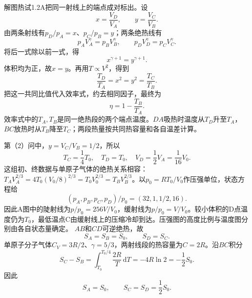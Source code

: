 \documentclass[UTF8,fontset=fandol,a4paper,11pt]{ctexart}
\begin{document}
解图热试1.2A把同一射线上的端点成对标出。设
\[
x=\frac{V_D}{V_A},\qquad y=\frac{V_C}{V_B}.
\]
由两条射线有$p_D/p_A=x$、$p_C/p_B=y$；两条绝热线有
\[
p_AV_A^\gamma=p_BV_B^\gamma,\qquad
p_DV_D^\gamma=p_CV_C^\gamma.
\]
将后一式除以前一式，得
\[
x^{\gamma+1}=y^{\gamma+1}.
\]
体积均为正，故$x=y$。再用$T\propto V^2$，得到
\[
\frac{T_D}{T_A}=x^2=y^2=\frac{T_C}{T_B}.
\]
把这一共同比值代入效率式，约去相同因子，最终为
\[
\boxed{\eta=1-\frac{T_B}{T_A}}.
\]
效率式中的$T_A,T_B$是同一绝热段的两个端点温度。$DA$吸热时温度从$T_D$升至$T_A$，$BC$放热时从$T_B$降至$T_C$；两段热量按共同热容量和各自温差计算。

第（2）问中，$y=V_C/V_B=1/2$，所以
\[
\boxed{T_C=\frac14T_0,\quad T_D=T_0,\quad
V_D=\frac12V_A=\frac1{16}V_0}.
\]
这组初、终数据与单原子气体的绝热关系相容：$T_AV_A^{2/3}=4T_0(V_0/8)^{2/3}=T_0V_0^{2/3}=T_BV_B^{2/3}$。以$p_0=RT_0/V_0$作压强单位，状态方程给
\[
 (p_A,p_B,p_C,p_D)/p_0=(32,1,1/2,16).
\]
因此A图中的陡射线为$p/p_0=256V/V_0$，缓射线为$p/p_0=V/V_0$。较小体积的D点温度仍为$T_0$，最低温点C由缓射线上的压缩冷却到达。压强图的高度比例与温度图分别由各自状态量确定。
$AB$和$CD$可逆绝热，故
\[
S_A=S_B=S_0,\qquad S_D=S_C.
\]
单原子分子气体$C_V=3R/2$、$\gamma=5/3$，两射线段的热容量为$C=2R$。沿$BC$积分
\[
S_C-S_B=\int_{T_0}^{T_0/4}\frac{2R}{T}\,\mathrm dT
=-4R\ln2=-\frac12 S_0.
\]
因此
\[
\boxed{S_A=S_0,\qquad S_C=S_D=\frac12S_0}.
\]
\end{document}
